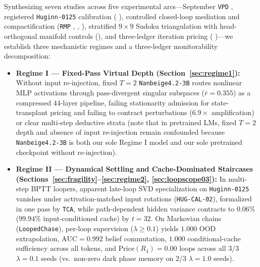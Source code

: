 \documentclass[10pt,letterpaper]{article}
\begin{document}
Synthesizing seven studies across five experimental arcs—September \texttt{VPD} \cite{dugan2026vpd}, registered \texttt{Huginn-0125} calibration ( \cite{dugan2026hugcal}), controlled closed-loop mediation and compactification (\texttt{RMP} \cite{dugan2026rmp},  \cite{dugan2026loopscope01},  \cite{dugan2026arg02}), stratified $9\times 9$ Sudoku triangulation with head-orthogonal manifold controls (), and three-ledger iteration pricing ( \cite{dugan2026loopscope01})—we establish three mechanistic regimes and a three-ledger monitorability decomposition:
\begin{itemize}
  \item \textbf{Regime I — Fixed-Pass Virtual Depth (Section~\ref{sec:regime1}):} Without input re-injection, fixed $T=2$ \texttt{Nanbeige4.2-3B} routes nonlinear MLP activations through pass-divergent singular subspaces ($\bar{r}=0.355$) as a compressed 44-layer pipeline, failing stationarity admission for state-transplant pricing and failing to contract perturbations ($6.9\times$ amplification) or clear multi-step deductive strata (note that in pretrained LMs, fixed $T=2$ depth and absence of input re-injection remain confounded because \texttt{Nanbeige4.2-3B} is both our sole Regime I model and our sole pretrained checkpoint without re-injection).
  \item \textbf{Regime II — Dynamical Settling and Cache-Dominated Staircases (Sections~\ref{sec:fragility}--\ref{sec:regime2}, \ref{sec:loopscope03}):} In multi-step BPTT loopers, apparent late-loop SVD specialization on \texttt{Huginn-0125} vanishes under activation-matched input rotations (\texttt{HUG-CAL-02}), formalized in one pass by \texttt{TCA}, while path-dependent hidden variance contracts to $0.06\%$ ($99.94\%$ input-conditioned cache) by $t=32$. On Markovian chains (\texttt{LoopedChase}), per-loop supervision ($\lambda \ge 0.1$) yields $1.000$ OOD extrapolation, $\mathrm{AUC}=0.992$ belief commutation, $1.000$ conditional-cache sufficiency across all tokens, and $\mathrm{Price}(R_4)=0.00$ loops across all $3/3$ $\lambda=0.1$ seeds (vs.\ non-zero dark phase memory on $2/3$ $\lambda=1.0$ seeds).

\end{itemize}
\end{document}
